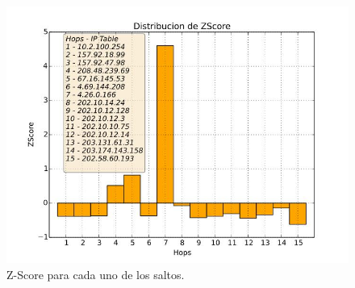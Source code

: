 \begin{figure}[H]
  \centering	
	\includegraphics[scale=0.3]{../australia-experiment/bar_z_score.jpeg}
  \caption{Z-Score para cada uno de los saltos.}
	\label{fig:histo-src-sitiotrabajo}
\end{figure}
